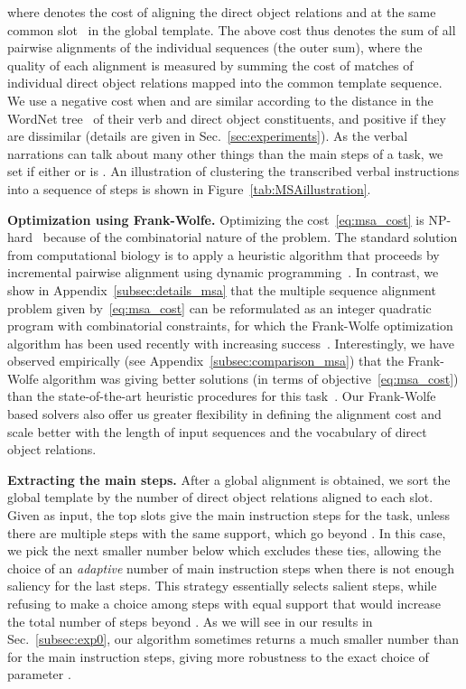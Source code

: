 \documentclass[10pt,twocolumn,letterpaper]{article}
\begin{document}
where  denotes the cost of aligning the direct object relations  and  at the same common slot~ in the global template. The above cost thus denotes the sum of all pairwise alignments of the individual sequences (the outer sum), where the quality of each alignment is measured by summing the cost  of matches of individual direct object relations mapped into the common template sequence. We use a negative cost when  and  
are similar according to the distance in the WordNet tree~\cite{Fellbaum98Wordnet,Miller95Wordnet} of their verb and direct object constituents, and positive if they are dissimilar (details are given in 
Sec.~\ref{sec:experiments}).
As the verbal narrations can talk about many other things than the main steps of a task,
we set  if either  or  is .
An illustration of clustering the transcribed verbal instructions into a sequence of  steps is shown in Figure~\ref{tab:MSAillustration}.



\textbf{Optimization using Frank-Wolfe.} 
Optimizing the cost~\eqref{eq:msa_cost} is NP-hard~\cite{wang1994msaNPhard} 
because of the combinatorial nature of the problem. The standard
solution from computational biology is to apply a heuristic algorithm that proceeds by incremental pairwise alignment using dynamic programming~\cite{Lee01poa}.
In contrast, we show in Appendix~\ref{subsec:details_msa} that the multiple sequence alignment problem given by~\eqref{eq:msa_cost} can be reformulated as an integer quadratic program with combinatorial constraints, for which the Frank-Wolfe optimization algorithm has been used recently with increasing success~\cite{Bojanowski14weakly,Jaggi2013,Joulin14efficient,Lacoste15GlobalLinearFW}. 
Interestingly, we have observed empirically (see Appendix~\ref{subsec:comparison_msa}) that
the Frank-Wolfe algorithm was giving better solutions (in terms of objective~\eqref{eq:msa_cost}) than the state-of-the-art heuristic procedures for this task~\cite{Higgins88clustal,Lee01poa}. Our Frank-Wolfe based solvers also offer us greater flexibility in defining the alignment cost and scale better with the length of input sequences and the vocabulary of direct object relations. 


\textbf{Extracting the main steps.}
After a global alignment is obtained, we sort the global template 
by the number of direct object relations aligned to each slot. Given
 as input, the top  slots give the main instruction steps for
the task, unless there are multiple steps with the same support, which
go beyond . In this case, we pick the next smaller number below 
which excludes these ties, allowing the choice of an \emph{adaptive}
number of main instruction steps when there is not enough saliency for
the last steps.  This strategy essentially selects  salient
steps, while refusing to make a choice among steps with equal support
that would increase the total number of steps beyond .  As we will
see in our results in Sec.~\ref{subsec:exp0}, our algorithm
sometimes returns a much smaller number than  for the main
instruction steps, giving more robustness to the exact choice of
parameter .
\end{document}
